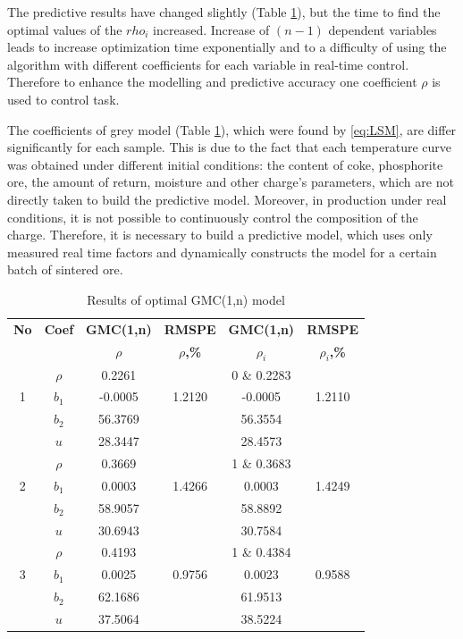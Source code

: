 \documentclass[AMS,STIX2COL]{WileyNJD-v2}
\begin{document}
The predictive results have changed slightly (Table \ref{tab:OGMC}), but the time to find the optimal values of the $rho_i$ increased. Increase of $(n-1)$ dependent variables leads to increase optimization time exponentially and to a difficulty of using the algorithm with different coefficients for each variable in real-time control. Therefore to enhance the modelling and predictive accuracy one coefficient $\rho$ is used to control task.

The coefficients of grey model (Table \ref{tab:OGMC}), which were found by \eqref{eq:LSM}, are differ significantly for each sample. This is due to the fact that each temperature curve was obtained under different initial conditions: the content of coke, phosphorite ore, the amount of return, moisture and other charge's parameters, which are not directly taken to build the predictive model. Moreover, in production under real conditions, it is not possible to continuously control the composition of the charge. Therefore, it is necessary to build a predictive model, which uses only measured real time factors and dynamically constructs the model for a certain batch of sintered ore. 

\begin{table}[htbp]
	\caption{Results of optimal GMC(1,n) model}
	\begin{center}
		\begin{tabular*}{500pt}{@{\extracolsep\fill}cccccc@{\extracolsep\fill}}
			\toprule
			\textbf{No} & \textbf{Coef} & \textbf{GMC(1,n)}  & \textbf{RMSPE} &\textbf{GMC(1,n)} & \textbf{RMSPE}\\
			& & \textbf{$\rho$} & \textbf{$\rho$,\%} &\textbf{$\rho_i$} & \textbf{$\rho_i$,\%}\\
			\midrule
			& $\rho$ & 0.2261 & & 0 \& 0.2283 & \\
			1 & $b_1$ & -0.0005 & 1.2120 & -0.0005 & 1.2110 \\
			& $b_2$ & 56.3769 & & 56.3554 & \\
			& $u$ & 28.3447 & & 28.4573 & \\
			\midrule
			& $\rho$ & 0.3669 & & 1 \& 0.3683 & \\
			2 & $b_1$ & 0.0003 & 1.4266 & 0.0003 & 1.4249 \\
			& $b_2$ & 58.9057 & & 58.8892 & \\
			& $u$ & 30.6943 & & 30.7584 & \\
			\midrule
			& $\rho$ & 0.4193 & & 1 \& 0.4384 & \\
			3 & $b_1$ & 0.0025 & 0.9756 & 0.0023 & 0.9588 \\
			& $b_2$ & 62.1686 & & 61.9513 & \\
			& $u$ & 37.5064 & & 38.5224 & \\
			\bottomrule
		\end{tabular*}
		\label{tab:OGMC}
	\end{center}
\end{table}
\end{document}
